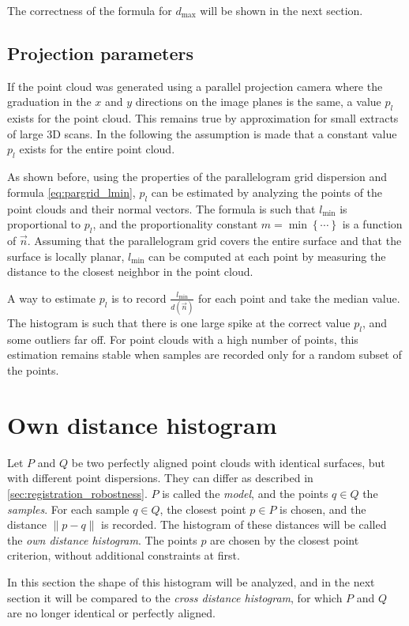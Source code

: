 The correctness of the formula for $d_{\text{max}}$ will be shown in the next section.


\subsection{Projection parameters}
If the point cloud was generated using a parallel projection camera where the graduation in the $x$ and $y$ directions on the image planes is the same, a value $p_l$ exists for the point cloud. This remains true by approximation for small extracts of large 3D scans. In the following the assumption is made that a constant value $p_l$ exists for the entire point cloud.

As shown before, using the properties of the parallelogram grid dispersion and formula \ref{eq:pargrid_lmin}, $p_l$ can be estimated by analyzing the points of the point clouds and their normal vectors. The formula is such that $l_{\text{min}}$ is proportional to $p_l$, and the proportionality constant $m = \min \left\{ \cdots \right\}$ is a function of $\vec{n}$. Assuming that the parallelogram grid covers the entire surface and that the surface is locally planar, $l_{\text{min}}$ can be computed at each point by measuring the distance to the closest neighbor in the point cloud.

A way to estimate $p_l$ is to record $\frac{l_{\text{min}}}{d(\vec{n})}$ for each point and take the median value. The histogram is such that there is one large spike at the correct value $p_l$, and some outliers far off. For point clouds with a high number of points, this estimation remains stable when samples are recorded only for a random subset of the points.



\section{Own distance histogram}
Let $P$ and $Q$ be two perfectly aligned point clouds with identical surfaces, but with different point dispersions. They can differ as described in \ref{sec:registration_robostness}. $P$ is called the \emph{model}, and the points $q \in Q$ the \emph{samples}. For each sample $q \in Q$, the closest point $p \in P$ is chosen, and the distance $\|p - q\|$ is recorded. The histogram of these distances will be called the \emph{own distance histogram}. The points $p$ are chosen by the closest point criterion, without additional constraints at first.

In this section the shape of this histogram will be analyzed, and in the next section it will be compared to the \emph{cross distance histogram}, for which $P$ and $Q$ are no longer identical or perfectly aligned.


